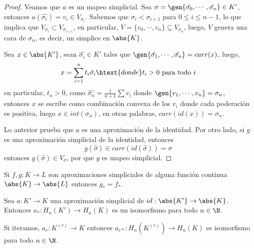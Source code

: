 \documentclass{article}
\begin{document}
\begin{proof}
    Veamos que $a$ es un mapeo simplicial. Sea $\sigma
    =\gen{\hat{\sigma_{0}},\cdots,\hat{\sigma_{n}}}\in K'$, entonces 
    $a(\hat{\sigma_{i}})=v_{i}\in V_{\sigma_{i}}$. Sabemos que $\sigma_{i}<\sigma_{i+1}$
    para $0\leq i\leq n-1$, lo que implica que $V_{\sigma_{i}}\subset V_{\sigma_{i+1}}$, en 
    particular, $V=\{v_{0},\cdots,v_{n}\}\subseteq V_{\sigma_{n}}$, luego, $V$ genera una cara de 
    $\sigma_{n}$, es decir, un simplice en $\abs{K}$.

    \vspace{2mm}
    Sea $x\in\abs{K'}$, sean $\hat{\sigma_{i}}\in K'$ tales que 
    $\gen{\hat{\sigma_{1}},\cdots,\hat{\sigma_{n}}}=carr(x)$, luego,
    \begin{equation*}
        x=\sum_{i=1}^{n}t_{i}\hat{\sigma_{i}}\htext{donde}t_{i}>0\text{ para todo }i
    \end{equation*}
    en particular, $t_{n}>0$, como $\hat{\sigma_{n}}=\frac{1}{n+1}\sum v_{i}$ donde 
    $\gen{v_{1},\cdots,v_{n}}=\sigma_{n}$, entonces $x$ se escribe como combinación convexa de los
    $v_{i}$ donde cada poderación es positiva, luego $x\in int(\sigma_{n})$, en otras palabras,
    $carr(id(x))=\sigma_{n}$.

    \vspace{2mm}
    Lo anterior prueba que $a$ es una aproximación de la identidad. Por otro lado, si $g$ es una
    aproximación simplicial de la identidad, entonces
    \begin{equation*}
        g(\hat{\sigma})\in carr(id(\hat{\sigma}))=\sigma
    \end{equation*}
    entonces $g(\hat{\sigma})\in V_{\sigma}$, por que $g$ es mapeo simplicial.
\end{proof}

\vspace{2mm}
\begin{lema}
    Si $f,g:K\to L$ son aproximaciones simpliciales de alguna función continua $\abs{K}\to\abs{L}$
    entonces $g_{*}=f_{*}$.
\end{lema}

\vspace{2mm}
\begin{lema}
    Sea $a:K'\to K$ una aproximación simplicial de $id:\abs{K'}\to\abs{K}$. Entonces 
    $a_{*}:H_{n}(K')\to H_{n}(K)$ es un isomorfismo para todo $n\in\N$.
\end{lema}

\noindent Si iteramos, $a_{r}:K^{(r)}\to K$ entonces $a_{r*}:H_{n}(K^{(r)})\to H_{n}(K)$ es 
isomorfismo para todo $n\in\N$.
\end{document}
